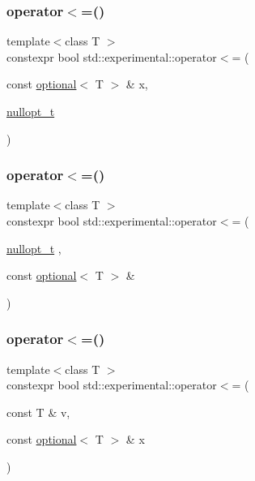 \subsubsection{\texorpdfstring{operator$<$=()}{operator<=()}\hspace{0.1cm}{\footnotesize\ttfamily [2/9]}}
{\footnotesize\ttfamily template$<$class T $>$ \\
constexpr bool std\+::experimental\+::operator$<$= (\begin{DoxyParamCaption}\item[{const \mbox{\hyperlink{classstd_1_1experimental_1_1optional}{optional}}$<$ T $>$ \&}]{x,  }\item[{\mbox{\hyperlink{structstd_1_1experimental_1_1nullopt__t}{nullopt\+\_\+t}}}]{ }\end{DoxyParamCaption})\hspace{0.3cm}{\ttfamily [noexcept]}}

\mbox{\label{namespacestd_1_1experimental_ae72fae9caf85b2dff2e94ebd29371937}} 
\subsubsection{\texorpdfstring{operator$<$=()}{operator<=()}\hspace{0.1cm}{\footnotesize\ttfamily [3/9]}}
{\footnotesize\ttfamily template$<$class T $>$ \\
constexpr bool std\+::experimental\+::operator$<$= (\begin{DoxyParamCaption}\item[{\mbox{\hyperlink{structstd_1_1experimental_1_1nullopt__t}{nullopt\+\_\+t}}}]{,  }\item[{const \mbox{\hyperlink{classstd_1_1experimental_1_1optional}{optional}}$<$ T $>$ \&}]{ }\end{DoxyParamCaption})\hspace{0.3cm}{\ttfamily [noexcept]}}

\mbox{\label{namespacestd_1_1experimental_a4482ae3dc6aad99b5d17a3a2c0dfe30f}} 
\subsubsection{\texorpdfstring{operator$<$=()}{operator<=()}\hspace{0.1cm}{\footnotesize\ttfamily [4/9]}}
{\footnotesize\ttfamily template$<$class T $>$ \\
constexpr bool std\+::experimental\+::operator$<$= (\begin{DoxyParamCaption}\item[{const T \&}]{v,  }\item[{const \mbox{\hyperlink{classstd_1_1experimental_1_1optional}{optional}}$<$ T $>$ \&}]{x }\end{DoxyParamCaption})}

